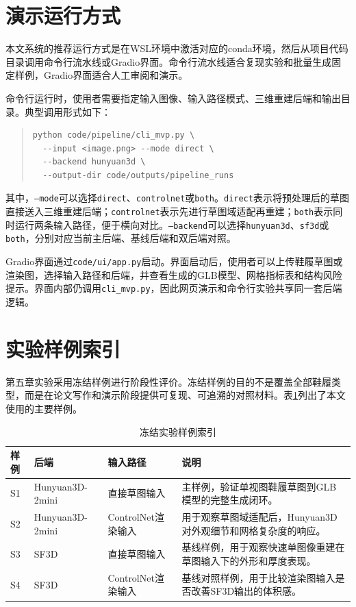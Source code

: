 \section{演示运行方式}

本文系统的推荐运行方式是在WSL环境中激活对应的conda环境，然后从项目代码目录调用命令行流水线或Gradio界面。命令行流水线适合复现实验和批量生成固定样例，Gradio界面适合人工审阅和演示。

命令行运行时，使用者需要指定输入图像、输入路径模式、三维重建后端和输出目录。典型调用形式如下：

\begin{quote}
\small
\begin{verbatim}
python code/pipeline/cli_mvp.py \
  --input <image.png> --mode direct \
  --backend hunyuan3d \
  --output-dir code/outputs/pipeline_runs
\end{verbatim}
\end{quote}

其中，\texttt{--mode}可以选择\texttt{direct}、\texttt{controlnet}或\texttt{both}。\texttt{direct}表示将预处理后的草图直接送入三维重建后端；\texttt{controlnet}表示先进行草图域适配再重建；\texttt{both}表示同时运行两条输入路径，便于横向对比。\texttt{--backend}可以选择\texttt{hunyuan3d}、\texttt{sf3d}或\texttt{both}，分别对应当前主后端、基线后端和双后端对照。

Gradio界面通过\texttt{code/ui/app.py}启动。界面启动后，使用者可以上传鞋履草图或渲染图，选择输入路径和后端，并查看生成的GLB模型、网格指标表和结构风险提示。界面内部仍调用\texttt{cli\_mvp.py}，因此网页演示和命令行实验共享同一套后端逻辑。

\section{实验样例索引}

第五章实验采用冻结样例进行阶段性评价。冻结样例的目的不是覆盖全部鞋履类型，而是在论文写作和演示阶段提供可复现、可追溯的对照材料。表\ref{tab:appendix-eval-index}列出了本文使用的主要样例。

\begin{table}[htbp]
  \centering
  \caption{冻结实验样例索引}
  \label{tab:appendix-eval-index}
  \small
  \begin{tabular}{@{}>{\raggedright\arraybackslash}p{}>{\raggedright\arraybackslash}p{}>{\raggedright\arraybackslash}p{}>{\raggedright\arraybackslash}p{}@{}}
    \toprule
    样例 & 后端 & 输入路径 & 说明 \\
    \midrule
    S1 & Hunyuan3D-2mini & 直接草图输入 & 主样例，验证单视图鞋履草图到GLB模型的完整生成闭环。 \\
    S2 & Hunyuan3D-2mini & ControlNet渲染输入 & 用于观察草图域适配后，Hunyuan3D对外观细节和网格复杂度的响应。 \\
    S3 & SF3D & 直接草图输入 & 基线样例，用于观察快速单图像重建在草图输入下的外形和厚度表现。 \\
    S4 & SF3D & ControlNet渲染输入 & 基线对照样例，用于比较渲染图输入是否改善SF3D输出的体积感。 \\
    \bottomrule
  \end{tabular}
\end{table}

